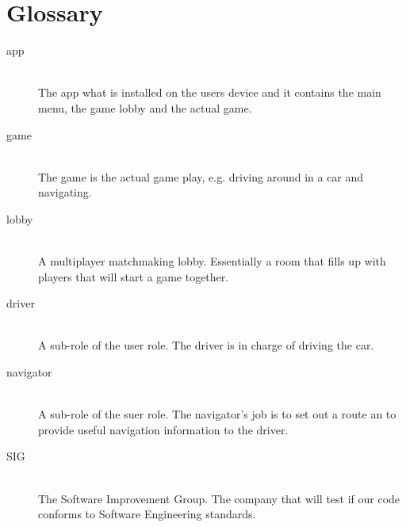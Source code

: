 \documentclass{article}
\begin{document}
\section{Glossary}
\begin{description}
\item[app] \hfill \\
The app what is installed on the users device and it contains the main menu, the game lobby and the actual game.
\item[game]\hfill \\
The game is the actual game play, e.g. driving around in a car and navigating.
\item[lobby] \hfill \\
A multiplayer matchmaking lobby. Essentially a room that fills up with players that will start a game together.
\item[driver] \hfill \\
A sub-role of the user role. The driver is in charge of driving the car.
\item[navigator]\hfill \\
A sub-role of the suer role. The navigator's job is to set out a route an to provide useful navigation information to the driver.
\item[SIG] \hfill \\
The Software Improvement Group. The company that will test if our code conforms to Software Engineering standards.
\end{description}
\end{document}
